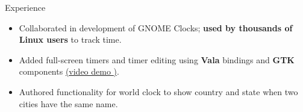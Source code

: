 \documentclass{resume} %
\begin{document}
\begin{workSection}{Experience}
	\experienceItem[
	company=GNOME Foundation,
	location=Remote,
	position=Open-Source Contributor,
	duration=December 2023 {-} June 2024
	]
	\begin{itemize}
		\vspace{-0.5em}
		\itemsep -6pt {}
		\item Collaborated 
		in development of GNOME Clocks; \textbf{used by thousands of Linux users} to track  time.
		\item Added 
		full-screen timers and timer editing using \textbf{Vala} bindings and \textbf{GTK} components \href{https://youtu.be/fDzYWusOLow}{(\underline{video demo \faExternalLink})}. %
		\item Authored functionality for world clock to show country and state when two cities have the same name. %
	\end{itemize}
	

\end{workSection}
\end{document}
